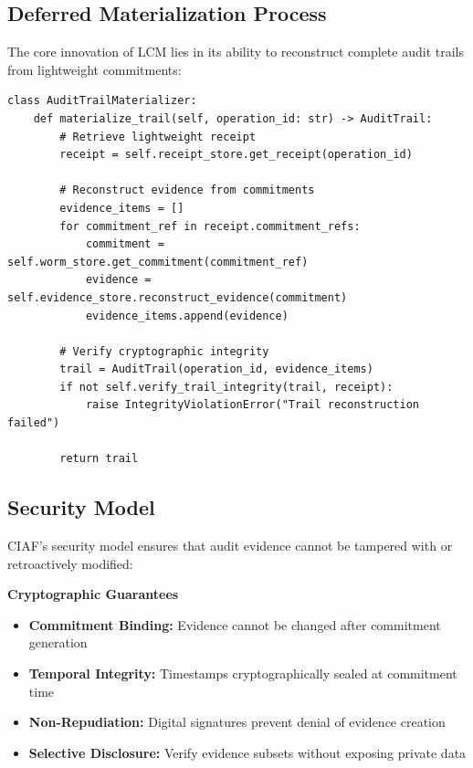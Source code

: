 \documentclass[12pt,a4paper]{article}
\begin{document}
\subsection{Deferred Materialization Process}

The core innovation of LCM lies in its ability to reconstruct complete audit trails from lightweight commitments:

\begin{lstlisting}[caption=Audit Trail Reconstruction Algorithm]
class AuditTrailMaterializer:
    def materialize_trail(self, operation_id: str) -> AuditTrail:
        # Retrieve lightweight receipt
        receipt = self.receipt_store.get_receipt(operation_id)
        
        # Reconstruct evidence from commitments
        evidence_items = []
        for commitment_ref in receipt.commitment_refs:
            commitment = self.worm_store.get_commitment(commitment_ref)
            evidence = self.evidence_store.reconstruct_evidence(commitment)
            evidence_items.append(evidence)
        
        # Verify cryptographic integrity
        trail = AuditTrail(operation_id, evidence_items)
        if not self.verify_trail_integrity(trail, receipt):
            raise IntegrityViolationError("Trail reconstruction failed")
        
        return trail
\end{lstlisting}

\subsection{Security Model}

CIAF's security model ensures that audit evidence cannot be tampered with or retroactively modified:

\begin{valuebox}
\textbf{Cryptographic Guarantees}
\begin{itemize}
\item \textbf{Commitment Binding:} Evidence cannot be changed after commitment generation
\item \textbf{Temporal Integrity:} Timestamps cryptographically sealed at commitment time  
\item \textbf{Non-Repudiation:} Digital signatures prevent denial of evidence creation
\item \textbf{Selective Disclosure:} Verify evidence subsets without exposing private data
\end{itemize}
\end{valuebox}
\end{document}
